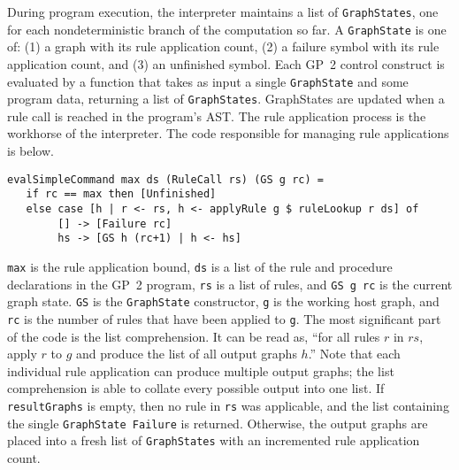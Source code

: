 During program execution, the interpreter maintains a list of \texttt{GraphStates}, one for each nondeterministic branch of the computation so far. A \texttt{GraphState} is one of: (1) a graph with its rule application count, (2) a failure symbol with its rule application count, and (3) an unfinished symbol. Each GP~2 control construct is evaluated by a function that takes as input a single \texttt{GraphState} and some program data, returning a list of \texttt{GraphStates}. {GraphStates} are updated when a rule call is reached in the program's AST. The rule application process is the workhorse of the interpreter. The code responsible for managing rule applications is below.

\begin{verbatim}
evalSimpleCommand max ds (RuleCall rs) (GS g rc) = 
   if rc == max then [Unfinished]
   else case [h | r <- rs, h <- applyRule g $ ruleLookup r ds] of
        [] -> [Failure rc]
        hs -> [GS h (rc+1) | h <- hs]
\end{verbatim}

\texttt{max} is the rule application bound, \texttt{ds} is a list of the rule and procedure declarations in the GP~2 program, \texttt{rs} is a list of rules, and \texttt{GS g rc} is the current graph state. \texttt{GS} is the \texttt{GraphState} constructor, \texttt{g} is the working host graph, and \texttt{rc} is the number of rules that have been applied to \texttt{g}. The most significant part of the code is the list comprehension. It can be read as, ``for all rules $r$ in $rs$, apply $r$ to $g$ and produce the list of all output graphs $h$.'' Note that each individual rule application can produce multiple output graphs; the list comprehension is able to collate every possible output into one list. If \texttt{resultGraphs} is empty, then no rule in \texttt{rs} was applicable, and the list containing the single \texttt{GraphState Failure} is returned. Otherwise, the output graphs are placed into a fresh list of \texttt{GraphStates} with an incremented rule application count.

